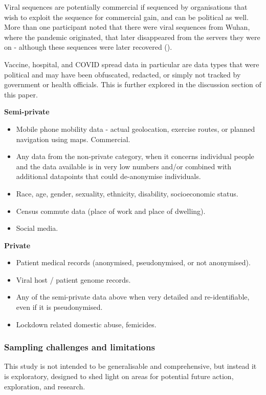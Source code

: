 \documentclass{CUP-JNL-DAP}%
\begin{document}
Viral sequences are potentially commercial if sequenced by organisations that wish to exploit the sequence for commercial gain, and can be political as well. More than one participant noted that there were viral sequences from Wuhan, where the pandemic originated, that later disappeared from the servers they were on - although these sequences were later recovered (\cite{bloom_recovery_2021}).

Vaccine, hospital, and COVID spread data in particular are data types that were political and may have been obfuscated, redacted, or simply not tracked by government or health officials. This is further explored in the discussion section of this paper.

\textbf{Semi-private}
\begin{itemize}
\item Mobile phone mobility data - actual geolocation, exercise routes, or planned navigation using maps. Commercial. 
\item Any data from the non-private category, when it concerns individual people and the data available is in very low numbers and/or combined with additional datapoints that could de-anonymise individuals. 
\item Race, age, gender, sexuality, ethnicity, disability, socioeconomic status.
\item Census commute data (place of work and place of dwelling). 
\item Social media.
\end{itemize}

\textbf{Private}
\begin{itemize}
\item Patient medical records (anonymised, pseudonymised, or not anonymised).
\item Viral host / patient genome records.
\item Any of the semi-private data above when very detailed and re-identifiable, even if it is pseudonymised.
\item Lockdown related domestic abuse, femicides. 
\end{itemize}

\subsubsection{Sampling challenges and limitations}

This study is not intended to be generalisable and comprehensive, but instead it is exploratory, designed to shed light on areas for potential future action, exploration, and research. 
\end{document}
